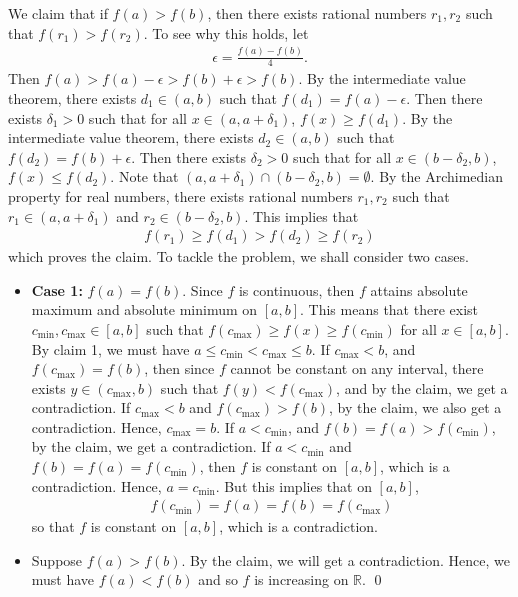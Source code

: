 \documentclass[11pt]{amsart}
\theoremstyle{plain}
\numberwithin{equation}{section}
\begin{document}
\newline
\newline We claim that if $f(a)>f(b)$, then there exists rational numbers $r_{1},r_{2}$ such that $f\left(r_{1}\right)>f\left(r_{2}\right)$. To see why this holds, let
\begin{align*}
    \epsilon=\frac{f(a)-f(b)}{4}.
\end{align*}
Then $f(a)>f(a)-\epsilon>f(b)+\epsilon>f(b)$. By the intermediate value theorem, there exists $d_{1}\in(a,b)$ such that $f\left(d_{1}\right)=f(a)-\epsilon$. Then there exists $\delta_{1}>0$ such that for all $x\in\left(a,a+\delta_{1}\right)$, $f(x)\geq f\left(d_{1}\right)$. By the intermediate value theorem, there exists $d_{2}\in(a,b)$ such that $f\left(d_{2}\right)=f(b)+\epsilon$. Then there exists $\delta_{2}>0$ such that for all $x\in\left(b-\delta_{2},b\right)$, $f(x)\leq f\left(d_{2}\right)$. Note that $\left(a,a+\delta_{1}\right)\cap\left(b-\delta_{2},b\right)=\emptyset$. By the Archimedian property for real numbers, there exists rational numbers $r_{1},r_{2}$ such that $r_{1}\in\left(a,a+\delta_{1}\right)$ and $r_{2}\in\left(b-\delta_{2},b\right)$. This implies that
\begin{align*}
    f\left(r_{1}\right)\geq f\left(d_{1}\right)>f\left(d_{2}\right)\geq f\left(r_{2}\right)
\end{align*}
which proves the claim. To tackle the problem, we shall consider two cases.
\begin{itemize}
    \itemsep 0em
    \item \textbf{Case 1:} $f(a)=f(b)$. Since $f$ is continuous, then $f$ attains absolute maximum and absolute minimum on $[a,b]$. This means that there exist $c_{\text{min}}, c_{\text{max}}\in[a,b]$ such that $f\left(c_{\text{max}}\right)\geq f(x)\geq f\left(c_{\text{min}}\right)$ for all $x\in[a,b]$. By claim 1, we must have $a\leq c_{\text{min}}<c_{\text{max}}\leq b$. If $c_{\text{max}}<b$, and $f\left(c_{\text{max}}\right)=f(b)$, then since $f$ cannot be constant on any interval, there exists $y\in\left(c_{\text{max}},b\right)$ such that $f(y)<f\left(c_{\text{max}}\right)$, and by the claim, we get a contradiction. If $c_{\text{max}}<b$ and $f\left(c_{\text{max}}\right)>f(b)$, by the claim, we also get a contradiction. Hence, $c_{\text{max}}=b$. If $a<c_{\text{min}}$, and $f(b)=f(a)>f\left(c_{\text{min}}\right)$, by the claim, we get a contradiction. If $a<c_{\text{min}}$ and $f(b)=f(a)=f\left(c_{\text{min}}\right)$, then $f$ is constant on $[a,b]$, which is a contradiction. Hence, $a=c_{\text{min}}$. But this implies that on $[a,b]$,
\begin{align*}
f\left(c_{\text{min}}\right)=f(a)=f(b)=f\left(c_{\text{max}}\right)
\end{align*}
so that $f$ is constant on $[a,b]$, which is a contradiction.
\item Suppose $f\left(a\right)>f\left(b\right)$. By the claim, we will get a contradiction. Hence, we must have $f(a)<f(b)$ and so $f$ is increasing on $\mathbb{R}$.  \qed 
\end{itemize}
\end{document}
